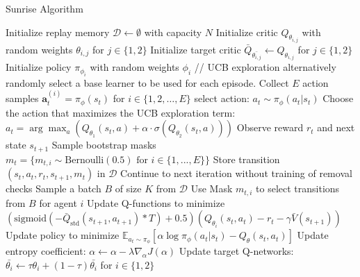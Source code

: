 \begin{algorithm}[H]
\caption{Sunrise Algorithm}
\begin{algorithmic}[1]
\State Initialize replay memory $\mathcal{D} \leftarrow \emptyset$ with capacity $N$
    \State Initialize critic $Q_{\theta_{i,j}}$ with random weights $\theta_{i,j}$ for $j \in \{1,2\}$
    \State Initialize target critic $\bar{Q}_{\bar{\theta_{i,j}}} \leftarrow Q_{\theta_{i,j}}$ for $j \in \{1,2\}$
    \State Initialize policy $\pi_{\phi_i}$ with random weights $\phi_i$
\EndFor
\Repeat
        \State // UCB exploration alternatively randomly select a base learner to be used for each episode.
        \State Collect $E$ action samples $\bm{a}_{t}^{(i)} = \pi_{\phi}(s_{t})$ for $i \in \{1,2,\ldots,E\}$
        \State select action: $a_{t} \sim \pi_{\phi}(a_{t} | s_{t})$
        \State Choose the action that maximizes the UCB exploration term:
        \State $a_{t} = \arg\max_{a} \left( Q_{\theta_1}(s_{t}, a) + \alpha \cdot \sigma(Q_{\theta_2}(s_{t}, a)) \right)$
        \State Observe reward $r_{t}$ and next state $s_{t+1}$
        \State Sample bootstrap masks $m_{t} = \{m_{t,i} \sim \text{Bernoulli}(0.5) \text{ for } i \in \{1,..., E\}\}$
        \State Store transition $(s_{t}, a_{t}, r_{t}, s_{t+1}, m_t)$ in $\mathcal{D}$
    \EndFor
        \State Continue to next iteration without training of removal checks
    \EndIf
        \State Sample a batch $B$ of size $K$ from $\mathcal{D}$
            \State Use Mask $m_{t,i}$ to select transitions from $B$ for agent $i$
            \State Update Q-functions to minimize $(\text{sigmoid}(-\bar{Q}_{\text{std}}(s_{t+1}, a_{t+1})*T)+0.5)(Q_{\theta_i}(s_t, a_t)-r_t-\gamma \bar{V}(s_{t+1}))$
            \State Update policy to minimize $\mathbb{E}_{a_t \sim \pi_\phi}\left[ \alpha \log \pi_\phi (a_t|s_t) - Q_\theta(s_t, a_t)\right]$
            \State Update entropy coefficient: $\alpha \gets \alpha - \lambda \hat{\nabla}_{\alpha} J(\alpha)$
            \State Update target Q-networks: $\bar{\theta_{i}} \gets \tau\theta_{i} + (1 - \tau) \bar{\theta_{i}}$ for $i \in \{1,2\}$
        \EndFor
    \EndFor
{}

\end{algorithmic}
\end{algorithm}
